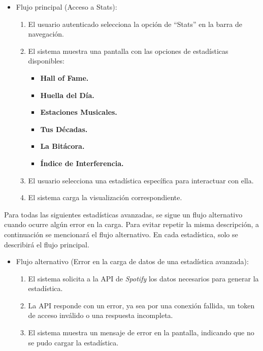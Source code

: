 \begin{itemize}
    \item Flujo principal (Acceso a Stats):
          \begin{enumerate}
              \item El usuario autenticado selecciona la opción de ``Stats'' en la barra de navegación.
              \item El sistema muestra una pantalla con las opciones de estadísticas disponibles:
                    \begin{itemize}
                        \item \textbf{Hall of Fame.}
                        \item \textbf{Huella del Día.}
                        \item \textbf{Estaciones Musicales.}
                        \item \textbf{Tus Décadas.}
                        \item \textbf{La Bitácora.}
                        \item \textbf{Índice de Interferencia.}
                    \end{itemize}
              \item El usuario selecciona una estadística específica para interactuar con ella.
              \item El sistema carga la visualización correspondiente.
          \end{enumerate}
\end{itemize}

Para todas las siguientes estadísticas avanzadas, se sigue un flujo alternativo cuando ocurre algún error en la carga. Para evitar repetir la misma descripción, a continuación se mencionará el flujo alternativo. En cada estadística, solo se describirá el flujo principal.

\begin{itemize}
    \item Flujo alternativo (Error en la carga de datos de una estadística avanzada):
          \begin{enumerate}
              \item El sistema solicita a la API de \textit{Spotify} los datos necesarios para generar la estadística.
              \item La API responde con un error, ya sea por una conexión fallida, un token de acceso inválido o una respuesta incompleta.
              \item El sistema muestra un mensaje de error en la pantalla, indicando que no se pudo cargar la estadística.
          \end{enumerate}
\end{itemize}

